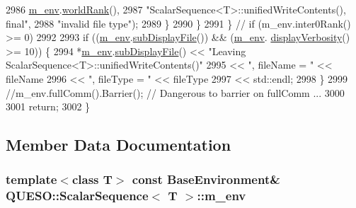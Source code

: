 \begin{DoxyCode}
2986                             \hyperlink{class_q_u_e_s_o_1_1_scalar_sequence_a71618cd6351b29361b437af68447a4c8}{m\_env}.\hyperlink{class_q_u_e_s_o_1_1_base_environment_a78b57112bbd0e6dd0e8afec00b40ffa7}{worldRank}(),
2987                             \textcolor{stringliteral}{"ScalarSequence<T>::unifiedWriteContents(), final"},
2988                             \textcolor{stringliteral}{"invalid file type"});
2989       \}
2990     \}
2991   \} \textcolor{comment}{// if (m\_env.inter0Rank() >= 0)}
2992 
2993   \textcolor{keywordflow}{if} ((\hyperlink{class_q_u_e_s_o_1_1_scalar_sequence_a71618cd6351b29361b437af68447a4c8}{m\_env}.\hyperlink{class_q_u_e_s_o_1_1_base_environment_a8a0064746ae8dddfece4229b9ad374d6}{subDisplayFile}()) && (\hyperlink{class_q_u_e_s_o_1_1_scalar_sequence_a71618cd6351b29361b437af68447a4c8}{m\_env}.
      \hyperlink{class_q_u_e_s_o_1_1_base_environment_a1fe5f244fc0316a0ab3e37463f108b96}{displayVerbosity}() >= 10)) \{
2994     *\hyperlink{class_q_u_e_s_o_1_1_scalar_sequence_a71618cd6351b29361b437af68447a4c8}{m\_env}.\hyperlink{class_q_u_e_s_o_1_1_base_environment_a8a0064746ae8dddfece4229b9ad374d6}{subDisplayFile}() << \textcolor{stringliteral}{"Leaving ScalarSequence<T>::unifiedWriteContents()"}
2995                             << \textcolor{stringliteral}{", fileName = "} << fileName
2996                             << \textcolor{stringliteral}{", fileType = "} << fileType
2997                             << std::endl;
2998   \}
2999   \textcolor{comment}{//m\_env.fullComm().Barrier(); // Dangerous to barrier on fullComm ...}
3000 
3001   \textcolor{keywordflow}{return};
3002 \}
\end{DoxyCode}


\subsection{Member Data Documentation}
\hypertarget{class_q_u_e_s_o_1_1_scalar_sequence_a71618cd6351b29361b437af68447a4c8}{
\subsubsection[{m\-\_\-env}]{\setlength{\rightskip}{0pt plus 5cm}template$<$class T$>$ const {\bf Base\-Environment}\& {\bf Q\-U\-E\-S\-O\-::\-Scalar\-Sequence}$<$ T $>$\-::m\-\_\-env\hspace{0.3cm}{\ttfamily [private]}}}\label{class_q_u_e_s_o_1_1_scalar_sequence_a71618cd6351b29361b437af68447a4c8}


